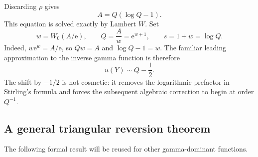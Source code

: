 \documentclass[11pt]{article}
\numberwithin{equation}{section}
\theoremstyle{mainthm}
\theoremstyle{defstyle}
\theoremstyle{remark}
\newcommand{\e}{\mathrm e}
\begin{document}
Discarding \(\rho\) gives
\begin{equation}\label{eq:carrier-equation}
 A=Q(\log Q-1).
\end{equation}
This equation is solved exactly by Lambert \(W\).  Set
\begin{equation}\label{eq:w-Q-s}
 w=W_0(A/\e),
 \qquad
 Q=\frac{A}{w}=\e^{w+1},
 \qquad
 s=1+w=\log Q.
\end{equation}
Indeed, \(w\e^w=A/\e\), so \(Qw=A\) and \(\log Q-1=w\).  The familiar leading approximation to the inverse gamma function is therefore
\begin{equation}\label{eq:leading-gamma-inverse}
 u(Y)\sim Q-\frac12.
\end{equation}
The shift by \(-1/2\) is not cosmetic: it removes the logarithmic prefactor in Stirling's formula and forces the subsequent algebraic correction to begin at order \(Q^{-1}\).

\subsection{A general triangular reversion theorem}

The following formal result will be reused for other gamma-dominant functions.
\end{document}
